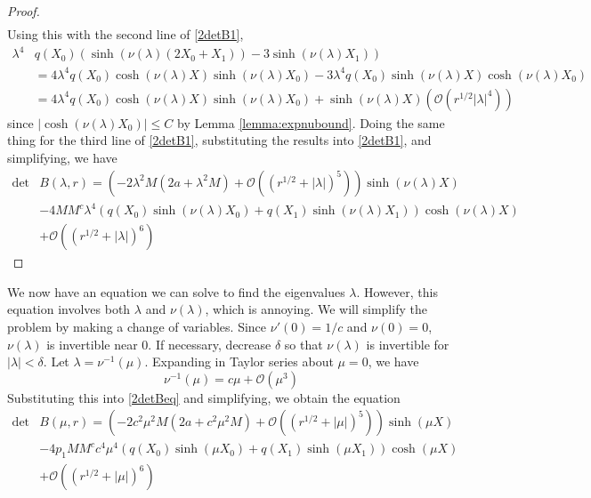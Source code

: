 \documentclass[thesis.tex]{subfiles}
\begin{document}
\begin{lemma}
\begin{proof}
\begin{align*}
\end{align*}
Using this with the second line of \cref{2detB1}, 
\begin{align*}
\lambda^4 &q(X_0) \left( \sinh(\nu(\lambda)(2 X_0 + X_1)) - 3 \sinh(\nu(\lambda)X_1)  \right) \\
&= 4 \lambda^4 q(X_0) \cosh(\nu(\lambda)X)\sinh(\nu(\lambda)X_0) - 3 \lambda^4 q(X_0) \sinh(\nu(\lambda)X)\cosh(\nu(\lambda)X_0) \\
&= 4 \lambda^4 q(X_0) \cosh(\nu(\lambda)X)\sinh(\nu(\lambda)X_0) + \sinh(\nu(\lambda)X)(\mathcal{O}(r^{1/2}|\lambda|^4))
\end{align*}
since $|\cosh(\nu(\lambda)X_0)|\leq C$ by Lemma \ref{lemma:expnubound}. Doing the same thing for the third line of \cref{2detB1}, substituting the results into \cref{2detB1}, and simplifying, we have
\begin{equation*}
\begin{aligned}
\det &B(\lambda, r) = \left(-2 \lambda^2 M (2a + \lambda^2 M) + \mathcal{O}( (r^{1/2} + |\lambda|)^5 )\right) \sinh(\nu(\lambda)X) \\
&-4 M M^c \lambda^4 ( q(X_0) \sinh(\nu(\lambda)X_0) + q(X_1) \sinh(\nu(\lambda)X_1) ) \cosh(\nu(\lambda)X)  \\
&+ \mathcal{O}( (r^{1/2} + |\lambda|)^6) 
\end{aligned}
\end{equation*}
\end{proof}
\end{lemma}

We now have an equation we can solve to find the eigenvalues $\lambda$. However, this equation involves both $\lambda$ and $\nu(\lambda)$, which is annoying. We will simplify the problem by making a change of variables. Since $\nu'(0) = 1/c$ and $\nu(0) = 0$, $\nu(\lambda)$ is invertible near 0. If necessary, decrease $\delta$ so that $\nu(\lambda)$ is invertible for $|\lambda| < \delta$. Let $\lambda = \nu^{-1}(\mu)$. Expanding in Taylor series about $\mu = 0$, we have
\[
\nu^{-1}(\mu) = c \mu + \mathcal{O}(\mu^3)
\]
Substituting this into \cref{2detBeq} and simplifying, we obtain the equation
\begin{equation}\label{2detBeqmu}
\begin{aligned}
\det &B(\mu, r) = \left(-2 c^2 \mu^2 M (2a + c^2 \mu^2 M) +  \mathcal{O}( (r^{1/2} + |\mu|)^5 )\right) \sinh(\mu X) \\
&-4 p_1 M M^c c^4 \mu^4 ( q(X_0) \sinh(\mu X_0) + q(X_1) \sinh(\mu X_1) ) \cosh(\mu X)  \\
&+ \mathcal{O}( (r^{1/2} + |\mu|)^6) 
\end{aligned}
\end{equation}
\end{document}
